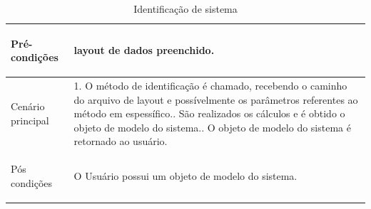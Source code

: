 \begin{table}[H]
\begin{center}
\begin{tabularx}{\textwidth}{|>{\bfseries\raggedright\arraybackslash\center}m{5cm}|X|}
            Pré-condições                                   & layout de dados preenchido.                                                                                                                                                                                                                                                                          \\ \hline
            Cenário principal                               & 1. O método de identificação é chamado, recebendo o caminho do arquivo de layout e possívelmente os parâmetros referentes ao método em espessífico.\newline 2. São realizados os cálculos e é obtido o objeto de modelo do sistema.\newline 3. O objeto de modelo do sistema é retornado ao usuário. \\ \hline
            Pós condições                                   & O Usuário possui um objeto de modelo do sistema.                                                                                                                                                                                                                                                     \\ \hline
        \end{tabularx}
        \caption{Identificação de sistema}
        \label{tab:uc2}
    \end{center}
\end{table}

